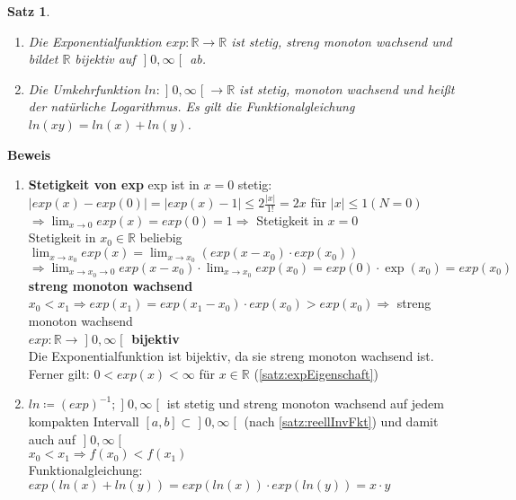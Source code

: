 \documentclass[ngerman,titlepage,twoside, parskip=half*]{scrreprt}
\newcommand*{\R}{\mathbb{R}}
\theoremstyle{plain}
\newtheorem{theorem}{Satz}[section]
\theoremstyle{definition}
\theoremstyle{remark}
\newcommand*{\bsofint}[1]{\mathopen{]}#1\mathclose{[}} %
\begin{document}
\begin{theorem}
\begin{enumerate}[i]
  \item Die Exponentialfunktion $exp\colon \R\rightarrow\R$ ist stetig, streng monoton wach\-send und bildet $\R$ bijektiv auf
    $\bsofint{0,\infty}$ ab.
  \item Die Umkehrfunktion $ln\colon\bsofint{0,\infty}\rightarrow\R$ ist stetig, monoton wachsend und heißt der \emph{natürliche
    Logarithmus}. Es gilt die Funktionalgleichung $ln(xy)=ln(x)+ln(y)$.
\end{enumerate}
\end{theorem}

\textbf{Beweis}
\begin{enumerate}[zu i]
  \item \textbf{Stetigkeit von exp} exp ist in $x=0$ stetig:\\
    $|exp(x)-exp(0)|=|exp(x)-1|\leq 2\frac{|x|}{1!}=2x$ für $|x|\leq 1 (N=0)$\\
    $\Rightarrow \lim_{x\rightarrow 0}exp(x)=exp(0)=1\Rightarrow$ Stetigkeit in $x=0$\\
    Stetigkeit in $x_0\in \R$ beliebig\\
    $\lim_{x\rightarrow x_0} exp(x)=\lim_{x\rightarrow x_0} (exp(x-x_0)\cdot exp(x_0))$\\
    $\Rightarrow \lim_{x\rightarrow x_0\rightarrow 0} exp(x-x_0)\cdot \lim_{x\rightarrow x_0} exp(x_0)=exp(0)\cdot \exp(x_0)
    =exp(x_0)$\\
    \textbf{streng monoton wachsend}\\
    $x_0<x_1 \Rightarrow exp(x_1)=exp(x_1-x_0)\cdot exp(x_0)>exp(x_0)\Rightarrow$ streng monoton wachsend\\
    \textbf{$exp\colon\R\rightarrow \bsofint{0,\infty}$ bijektiv}\\
    Die Exponentialfunktion ist bijektiv, da sie streng monoton wachsend ist. Ferner gilt: $0<exp(x)<\infty$ für $x\in\R$
    (\autoref{satz:expEigenschaft})
  \item $ln\coloneqq(exp)^{-1}; \bsofint{0,\infty}$ ist stetig und streng monoton wachsend auf jedem kompakten Intervall $[a,b]\subset \bsofint{0,
    \infty}$ (nach \autoref{satz:reellInvFkt})
    und damit auch auf $\bsofint{0,\infty}$\\
    $x_0<x_1 \Rightarrow f(x_0)<f(x_1)$\\
    Funktionalgleichung:\\
    $exp(ln (x)+ln(y))=exp(ln(x))\cdot exp(ln(y))=x\cdot y$
\end{enumerate}
\end{document}
